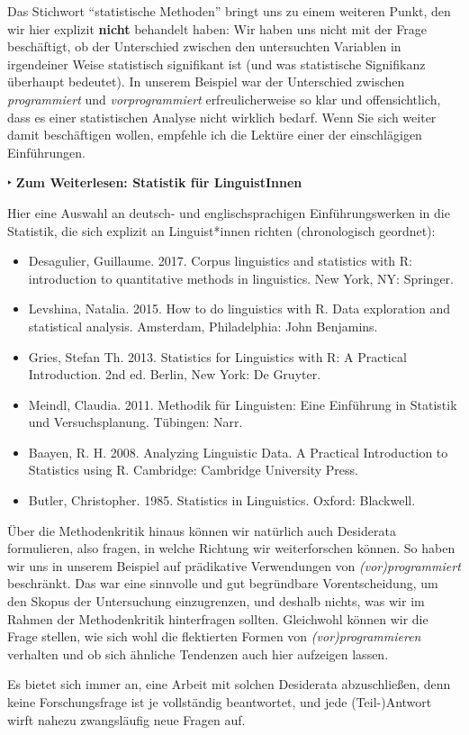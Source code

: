 \documentclass[]{article}
\begin{document}
Das Stichwort \enquote{statistische Methoden} bringt uns zu einem
weiteren Punkt, den wir hier explizit \textbf{nicht} behandelt haben:
Wir haben uns nicht mit der Frage beschäftigt, ob der Unterschied
zwischen den untersuchten Variablen in irgendeiner Weise statistisch
signifikant ist (und was statistische Signifikanz überhaupt bedeutet).
In unserem Beispiel war der Unterschied zwischen \emph{programmiert} und
\emph{vorprogrammiert} erfreulicherweise so klar und offensichtlich,
dass es einer statistischen Analyse nicht wirklich bedarf. Wenn Sie sich
weiter damit beschäftigen wollen, empfehle ich die Lektüre einer der
einschlägigen Einführungen.

 ‣ \textbf{Zum Weiterlesen: Statistik für LinguistInnen}

Hier eine Auswahl an deutsch- und englischsprachigen Einführungswerken
in die Statistik, die sich explizit an Linguist*innen richten
(chronologisch geordnet):

\begin{itemize}
\item
  Desagulier, Guillaume. 2017. Corpus linguistics and statistics with R:
  introduction to quantitative methods in linguistics. New York, NY:
  Springer.
\item
  Levshina, Natalia. 2015. How to do linguistics with R. Data
  exploration and statistical analysis. Amsterdam, Philadelphia: John
  Benjamins.
\item
  Gries, Stefan Th. 2013. Statistics for Linguistics with R: A Practical
  Introduction. 2nd ed. Berlin, New York: De Gruyter.
\item
  Meindl, Claudia. 2011. Methodik für Linguisten: Eine Einführung in
  Statistik und Versuchsplanung. Tübingen: Narr.
\item
  Baayen, R. H. 2008. Analyzing Linguistic Data. A Practical
  Introduction to Statistics using R. Cambridge: Cambridge University
  Press.
\item
  Butler, Christopher. 1985. Statistics in Linguistics. Oxford:
  Blackwell.
\end{itemize}

Über die Methodenkritik hinaus können wir natürlich auch Desiderata
formulieren, also fragen, in welche Richtung wir weiterforschen können.
So haben wir uns in unserem Beispiel auf prädikative Verwendungen von
\emph{(vor)programmiert} beschränkt. Das war eine sinnvolle und gut
begründbare Vorentscheidung, um den Skopus der Untersuchung
einzugrenzen, und deshalb nichts, was wir im Rahmen der Methodenkritik
hinterfragen sollten. Gleichwohl können wir die Frage stellen, wie sich
wohl die flektierten Formen von \emph{(vor)programmieren} verhalten und
ob sich ähnliche Tendenzen auch hier aufzeigen lassen.

Es bietet sich immer an, eine Arbeit mit solchen Desiderata
abzuschließen, denn keine Forschungsfrage ist je vollständig
beantwortet, und jede (Teil-)Antwort wirft nahezu zwangsläufig neue
Fragen auf.
\end{document}
